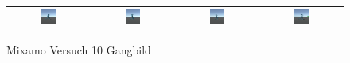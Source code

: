 \begin{figure}[H]
  \centering
  \begin{tabular}{cccc}
    \includegraphics[width=0.2\textwidth]{img/charakter_mixamo_galoppieren1} & \includegraphics[width=0.2\textwidth]{img/charakter_mixamo_galoppieren2} & \includegraphics[width=0.2\textwidth]{img/charakter_mixamo_galoppieren3} & \includegraphics[width=0.2\textwidth]{img/charakter_mixamo_galoppieren4} \\
  \end{tabular}
  \caption{Mixamo Versuch 10 Gangbild}
  \label{fig:mixamo_versuch10_gangbild}
\end{figure}